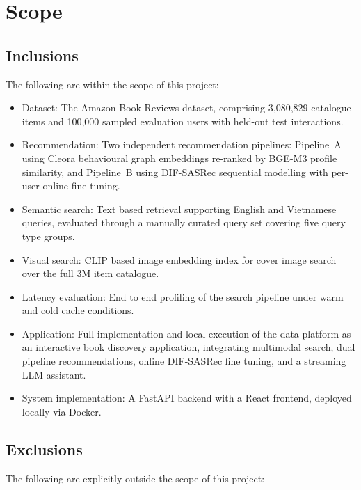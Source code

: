 \section{Scope}
\label{sec:scope}

\subsection{Inclusions}

The following are within the scope of this project:

\begin{itemize}
    \item Dataset: The Amazon Book Reviews dataset, comprising 3{,}080{,}829 catalogue items and 100{,}000 sampled evaluation users with held-out test interactions.
    \item Recommendation: Two independent recommendation pipelines: Pipeline~A using Cleora behavioural graph embeddings re-ranked by BGE-M3 profile similarity, and Pipeline~B using DIF-SASRec sequential modelling with per-user online fine-tuning.
    \item Semantic search: Text based retrieval supporting English and Vietnamese queries, evaluated through a manually curated query set covering five query type groups.
    \item Visual search: CLIP based image embedding index for cover image search over the full 3M item catalogue.
    \item Latency evaluation: End to end profiling of the search pipeline under warm and cold cache conditions.
    \item Application: Full implementation and local execution of the data platform as an interactive book discovery application, integrating multimodal search, dual pipeline recommendations, online DIF-SASRec fine tuning, and a streaming LLM assistant.
    \item System implementation: A FastAPI backend with a React frontend, deployed locally via Docker.
\end{itemize}

\subsection{Exclusions}

The following are explicitly outside the scope of this project:

